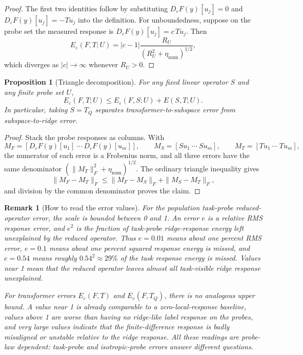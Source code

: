 \documentclass[11pt]{article}
\newtheorem{proposition}{Proposition}
\newtheorem{remark}{Remark}
\begin{document}
\begin{proof}
The first two identities follow by substituting \(D_\varepsilon F(y)[u_j]=0\) and
\(D_\varepsilon F(y)[u_j]=-Tu_j\) into the definition. For unboundedness, suppose on the probe set
the measured response is \(D_\varepsilon F(y)[u_j]=c\,Tu_j\). Then
\[
E_\varepsilon(F,T;U)
=
|c-1|\frac{R_U}{(R_U^2+\eta_{\mathrm{num}})^{1/2}},
\]
which diverges as \(|c|\to\infty\) whenever \(R_U>0\).
\end{proof}

\begin{proposition}[Triangle decomposition]
\label{prop:error-triangle}
For any fixed linear operator \(S\) and any finite probe set \(U\),
\[
E_\varepsilon(F,T;U)
\le
E_\varepsilon(F,S;U)+E(S,T;U).
\]
In particular, taking \(S=T_Q\) separates transformer-to-subspace error from subspace-to-ridge
error.
\end{proposition}

\begin{proof}
Stack the probe responses as columns. With
\[
M_F=[D_\varepsilon F(y)[u_1]\ \cdots\ D_\varepsilon F(y)[u_m]],
\qquad
M_S=[Su_1\ \cdots\ Su_m],
\qquad
M_T=[Tu_1\ \cdots\ Tu_m],
\]
the numerator of each error is a Frobenius norm, and all three errors have the same denominator
\((\|M_T\|_F^2+\eta_{\mathrm{num}})^{1/2}\). The ordinary triangle inequality gives
\[
\|M_F-M_T\|_F\le \|M_F-M_S\|_F+\|M_S-M_T\|_F,
\]
and division by the common denominator proves the claim.
\end{proof}

\begin{remark}[How to read the error values]
For the population task-probe reduced-operator error, the scale is bounded between 0 and 1.
An error \(e\) is a relative RMS response error, and \(e^2\) is the fraction of task-probe
ridge-response energy left unexplained by the reduced operator. Thus \(e=0.01\) means about one
percent RMS error, \(e=0.1\) means about one percent squared response energy is missed, and
\(e=0.54\) means roughly \(0.54^2\approx29\%\) of the task response energy is missed. Values near
1 mean that the reduced operator leaves almost all task-visible ridge response unexplained.

For transformer errors \(E_\varepsilon(F,T)\) and \(E_\varepsilon(F,T_Q)\), there is no analogous
upper bound. A value near 1 is already comparable to a zero-local-response baseline, values above
1 are worse than having no ridge-like label response on the probes, and very large values indicate
that the finite-difference response is badly misaligned or unstable relative to the ridge response.
All these readings are probe-law dependent: task-probe and isotropic-probe errors answer different
questions.
\end{remark}
\end{document}
